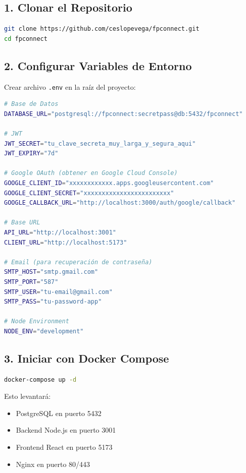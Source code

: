 \documentclass[a4paper]{report}
\begin{document}
\subsection{1. Clonar el Repositorio}

\begin{lstlisting}[language=bash]
git clone https://github.com/ceslopevega/fpconnect.git
cd fpconnect
\end{lstlisting}

\subsection{2. Configurar Variables de Entorno}

Crear archivo \texttt{.env} en la raíz del proyecto:

\begin{lstlisting}[language=bash]
# Base de Datos
DATABASE_URL="postgresql://fpconnect:secretpass@db:5432/fpconnect"

# JWT
JWT_SECRET="tu_clave_secreta_muy_larga_y_segura_aqui"
JWT_EXPIRY="7d"

# Google OAuth (obtener en Google Cloud Console)
GOOGLE_CLIENT_ID="xxxxxxxxxxxx.apps.googleusercontent.com"
GOOGLE_CLIENT_SECRET="xxxxxxxxxxxxxxxxxxxxxxxx"
GOOGLE_CALLBACK_URL="http://localhost:3000/auth/google/callback"

# Base URL
API_URL="http://localhost:3001"
CLIENT_URL="http://localhost:5173"

# Email (para recuperación de contraseña)
SMTP_HOST="smtp.gmail.com"
SMTP_PORT="587"
SMTP_USER="tu-email@gmail.com"
SMTP_PASS="tu-password-app"

# Node Environment
NODE_ENV="development"
\end{lstlisting}

\subsection{3. Iniciar con Docker Compose}

\begin{lstlisting}[language=bash]
docker-compose up -d
\end{lstlisting}

Esto levantará:
\begin{itemize}
  \item PostgreSQL en puerto 5432
  \item Backend Node.js en puerto 3001
  \item Frontend React en puerto 5173
  \item Nginx en puerto 80/443
\end{itemize}
\end{document}
